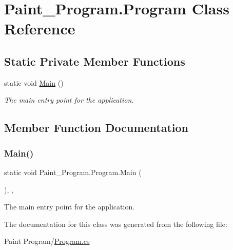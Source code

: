 \hypertarget{class_paint___program_1_1_program}{}\section{Paint\+\_\+\+Program.\+Program Class Reference}
\label{class_paint___program_1_1_program}
\subsection*{Static Private Member Functions}
\begin{DoxyCompactItemize}
\item 
static void \mbox{\hyperlink{class_paint___program_1_1_program_a0586d6d89a54c2fecfbb3fd893329c1f}{Main}} ()
\begin{DoxyCompactList}\small\item\em The main entry point for the application. \end{DoxyCompactList}\end{DoxyCompactItemize}


\subsection{Member Function Documentation}
\mbox{\label{class_paint___program_1_1_program_a0586d6d89a54c2fecfbb3fd893329c1f}} 
\subsubsection{\texorpdfstring{Main()}{Main()}}
{\footnotesize\ttfamily static void Paint\+\_\+\+Program.\+Program.\+Main (\begin{DoxyParamCaption}{ }\end{DoxyParamCaption})\hspace{0.3cm}{\ttfamily [inline]}, {\ttfamily [static]}, {\ttfamily [private]}}



The main entry point for the application. 



The documentation for this class was generated from the following file\+:\begin{DoxyCompactItemize}
\item 
Paint Program/\mbox{\hyperlink{_program_8cs}{Program.\+cs}}\end{DoxyCompactItemize}
